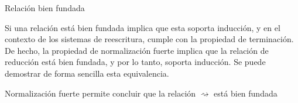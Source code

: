 \begin{codigo}
	Relación bien fundada
\end{codigo}

Si una relación está bien fundada implica que esta soporta inducción, y en el contexto de los sistemas de reescritura, cumple con la propiedad de terminación.
De hecho, la propiedad de normalización fuerte implica que la relación de reducción está bien fundada, y por lo tanto, soporta inducción.
Se puede demostrar de forma sencilla esta equivalencia.

\begin{codigo}
	Normalización fuerte permite concluir que la relación $\rightsquigarrow$ está bien fundada
\end{codigo} 
